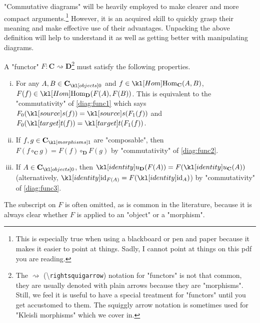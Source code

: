 \documentclass[main.tex]{subfiles}
\begin{document}
\begin{rem}
	"Commutative diagrams" will be heavily employed to make clearer and more compact arguments.\footnote{This is especially true when using a blackboard or pen and paper because it makes it easier to point at things. Sadly, I cannot point at things on this pdf you are reading.} However, it is an acquired skill to quickly grasp their meaning and make effective use of their advantages. Unpacking the above definition will help to understand it as well as getting better with manipulating diagrams.
	
	A "functor" $F:\mathbf{C}\rightsquigarrow \mathbf{D}$\footnote{The $\rightsquigarrow$ (\textbackslash\texttt{rightsquigarrow}) notation for "functors" is not that common, they are usually denoted with plain arrows because they are "morphisms". Still, we feel it is useful to have a special treatment for "functors" until you get accustomed to them. The squiggly arrow notation is sometimes used for "Kleisli morphisms" which we cover in.} must satisfy the following properties.%
	\begin{enumerate}[i.]
		\item For any $A, B \in \obj{\mathbf{C}}$ and $f \in \Hom_{\mathbf{C}}(A,B)$, $F(f) \in \Hom_{\mathbf{D}}(F(A), F(B))$. This is equivalent to the "commutativity" of \eqref{diag:func1} which says $F_0(\source(f)) = \source(F_1(f))$ and $F_0(\target(f)) = \target(F_1(f))$.
		\item If $f,g \in \mor{\mathbf{C}}$ are "composable", then $F(f\circ_{\mathbf{C}} g) = F(f) \circ_{\mathbf{D}} F(g)$ by "commutativity" of \eqref{diag:func2}.
		\item If $A \in \obj{\mathbf{C}}$, then $\idu_{\mathbf{D}}(F(A)) = F(\idu_{\mathbf{C}}(A))$ (alternatively, $\id_{F(A)} = F(\id_A)$) by "commutativity" of \eqref{diag:func3}.
	\end{enumerate}
	The subscript on $F$ is often omitted, as is common in the literature, because it is always clear whether $F$ is applied to an "object" or a "morphism".
\end{rem}
\end{document}
